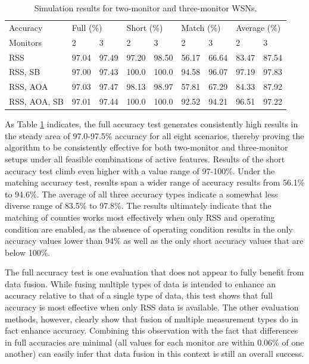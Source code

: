\documentclass[12pt]{uthesis-v12}  %
\renewcommand{\arraystretch}{1.2}
\begin{document}
\begin{table}[!t]
\renewcommand{\arraystretch}{1.3}
\caption{Simulation results for two-monitor and three-monitor WSNs.}
\label{table_example}
\centering
\resizebox{\textwidth}{!}
{\begin{tabular}{*{7}{l}|*{2}{l}}
\toprule
Accuracy  & \multicolumn{2}{l}{Full (\%)} & \multicolumn{2}{l}{Short (\%)} & \multicolumn{2}{l|}{Match (\%)} & \multicolumn{2}{l}{Average (\%)} \\
Monitors & 2 & 3 & 2 & 3 & 2 & 3 & 2 & 3 \\ \midrule
RSS & 97.04 & 97.49 & 97.20 & 98.50 & 56.17 & 66.64 & 83.47 & 87.54 \\
RSS, SB & 97.00 & 97.43 & 100.0 & 100.0 & 94.58 & 96.07 & 97.19 & 97.83 \\
RSS, AOA & 97.03 & 97.47 & 98.13 & 98.97 & 57.81 & 67.29 & 84.33 & 87.92 \\
RSS, AOA, SB & 97.01 & 97.44 & 100.0 & 100.0 & 92.52 & 94.21 & 96.51 & 97.22 \\ \bottomrule
\end{tabular}}
\end{table}

As Table \ref{table_example} indicates, the full accuracy test generates consistently high results in the steady area of 97.0-97.5\% accuracy for all eight scenarios, thereby proving the algorithm to be consistently effective for both two-monitor and three-monitor setups under all feasible combinations of active features. Results of the short accuracy test climb even higher with a value range of 97-100\%. Under the matching accuracy test, results span a wider range of accuracy results from 56.1\% to 94.6\%. The average of all three accuracy types indicate a somewhat less diverse range of 83.5\% to 97.8\%. The results ultimately indicate that the matching of counties works most effectively when only RSS and operating condition are enabled, as the absence of operating condition results in the only accuracy values lower than 94\% as well as the only short accuracy values that are below 100\%. 

The full accuracy test is one evaluation that does not appear to fully benefit from data fusion. While fusing multiple types of data is intended to enhance an accuracy relative to that of a single type of data, this test shows that full accuracy is most effective when only RSS data is available. The other evaluation methods, however, clearly show that fusion of multiple measurement types do in fact enhance accuracy. Combining this observation with the fact that differences in full accuracies are minimal (all values for each monitor are within 0.06\% of one another) can easily infer that data fusion in this context is still an overall success. 
\end{document}
